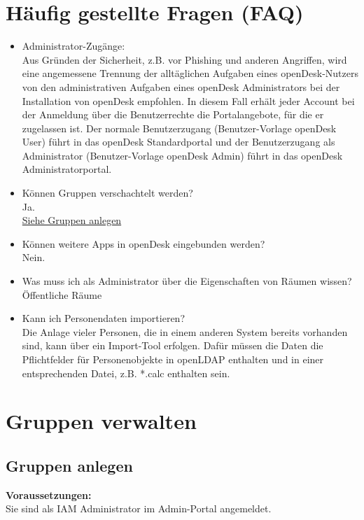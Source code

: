 \documentclass[
  letterpaper,
  DIV=11,
  numbers=noendperiod]{scrreprt}
\begin{document}
\chapter{Häufig gestellte Fragen
(FAQ)}\label{huxe4ufig-gestellte-fragen-faq}

\begin{itemize}
\item
  Administrator-Zugänge:\\
  Aus Gründen der Sicherheit, z.B. vor Phishing und anderen Angriffen,
  wird eine angemessene Trennung der alltäglichen Aufgaben eines
  openDesk-Nutzers von den administrativen Aufgaben eines openDesk
  Administrators bei der Installation von openDesk empfohlen. In diesem
  Fall erhält jeder Account bei der Anmeldung über die Benutzerrechte
  die Portalangebote, für die er zugelassen ist. Der normale
  Benutzerzugang (Benutzer-Vorlage openDesk User) führt in das openDesk
  Standardportal und der Benutzerzugang als Administrator
  (Benutzer-Vorlage openDesk Admin) führt in das openDesk
  Administratorportal.
\item
  Können Gruppen verschachtelt werden?\\
  Ja.\\
  \hyperref[gruppen-anlegen]{Siehe Gruppen anlegen}
\item
  Können weitere Apps in openDesk eingebunden werden?\\
  Nein.
\item
  Was muss ich als Administrator über die Eigenschaften von Räumen
  wissen? Öffentliche Räume
\item
  Kann ich Personendaten importieren?\\
  Die Anlage vieler Personen, die in einem anderen System bereits
  vorhanden sind, kann über ein Import-Tool erfolgen. Dafür müssen die
  Daten die Pflichtfelder für Personenobjekte in openLDAP enthalten und
  in einer entsprechenden Datei, z.B. *.calc enthalten sein.
\end{itemize}

\chapter{Gruppen verwalten}\label{gruppen-verwalten}

\section{Gruppen anlegen}\label{gruppen-anlegen}

\textbf{Voraussetzungen:}\\
Sie sind als IAM Administrator im Admin-Portal angemeldet.
\end{document}

